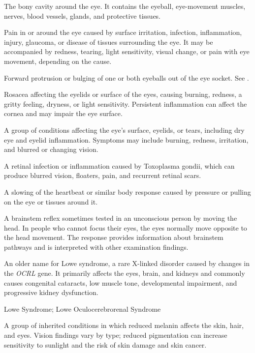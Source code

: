  The bony cavity around the eye. It contains the eyeball, eye-movement muscles, nerves, blood vessels, glands, and protective tissues.

 Pain in or around the eye caused by surface irritation,
infection, inflammation, injury, glaucoma, or disease of tissues surrounding the
eye. It may be accompanied by redness, tearing, light sensitivity, visual change, or
pain with eye movement, depending on the cause.

 Forward protrusion or bulging of one or both eyeballs out of the eye socket. See .

 Rosacea affecting the eyelids or surface of the eyes, causing burning, redness, a gritty feeling, dryness, or light sensitivity. Persistent inflammation can affect the cornea and may impair the eye surface.

 A group of conditions affecting the eye's surface, eyelids, or tears, including dry eye and eyelid inflammation. Symptoms may include burning, redness, irritation, and blurred or changing vision.

 A retinal infection or inflammation caused by Toxoplasma gondii, which can produce blurred vision, floaters, pain, and recurrent retinal scars.

 A slowing of the heartbeat or similar body response caused by pressure or pulling on the eye or tissues around it.

 A brainstem reflex sometimes tested in an unconscious person by moving the head. In people who cannot focus their eyes, the eyes normally move opposite to the head movement. The response provides information about brainstem pathways and is interpreted with other examination findings.

 An older name for Lowe syndrome, a rare X-linked disorder caused by changes in the \textit{OCRL} gene. It primarily affects the eyes, brain, and kidneys and commonly causes congenital cataracts, low muscle tone, developmental impairment, and progressive kidney dysfunction.

\synonyms
Lowe Syndrome; Lowe Oculocerebrorenal Syndrome

 A group of inherited conditions in which reduced melanin affects the skin, hair, and eyes. Vision findings vary by type; reduced pigmentation can increase sensitivity to sunlight and the risk of skin damage and skin cancer.

